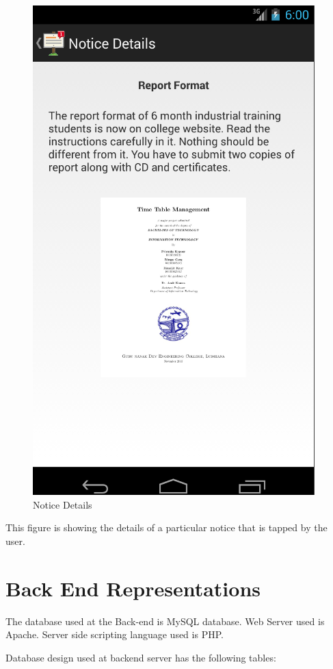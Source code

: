 \begin{figure}[H]
\centering \includegraphics[scale=0.7]{image/detail.png}
\caption{Notice Details}
\end{figure}

This figure is showing the details of a particular notice that is tapped by the user.
\pagebreak
\section{Back End Representations}
The database used at the Back-end is MySQL database. Web Server used is Apache. Server side scripting language used is PHP.

Database design used at backend server has the following tables:

